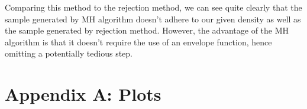 \documentclass[11pt, a4paper]{article}
\begin{document}
Comparing this method to the rejection method, we can see quite clearly that the sample generated by MH algorithm doesn't adhere to our given density as well as the sample generated by rejection method. However, the advantage of the MH algorithm is that it doesn't require the use of an envelope function, hence omitting a potentially tedious step.


\newpage
\section{Appendix A: Plots}

\begin{figure}[H]
\begin{minipage}{.55\linewidth}
\centering
{}
\end{minipage}
\begin{minipage}{.5\linewidth}
\centering
{}
\end{minipage}

\end{figure}
\end{document}

